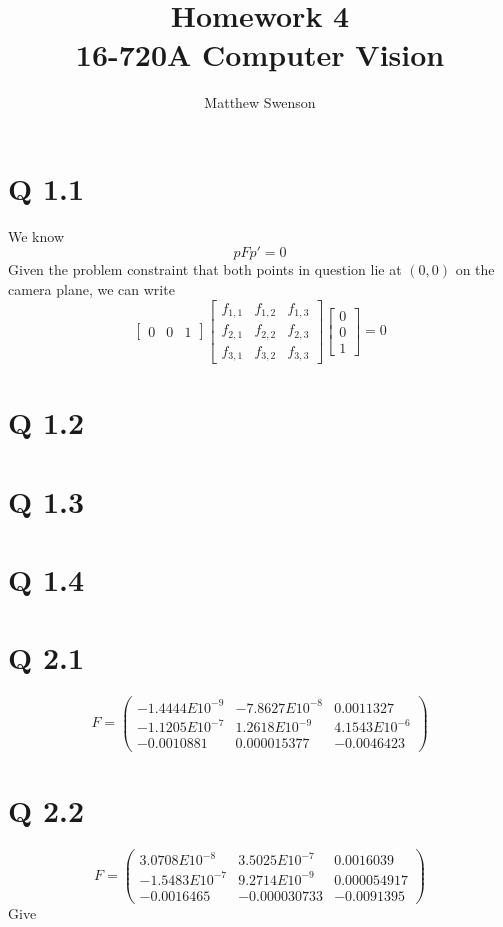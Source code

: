 \documentclass[11pt]{article}
\title{Homework 4\\ \vspace{2mm}\Large{16-720A Computer Vision }}
\author{Matthew Swenson}
\begin{document}
	\maketitle
	
\section*{Q 1.1}
We know 
$$pFp'=0$$
Given the problem constraint that both points in question lie at $(0,0)$ on the camera plane, we can write
$$
\begin{bmatrix}0 &0& 1\end{bmatrix}
\left[\begin{array}{ccc} f_{1,1} & f_{1,2} & f_{1,3}\\ f_{2,1} & f_{2,2} & f_{2,3}\\ f_{3,1} & f_{3,
2} & f_{3,3} \end{array}\right]
\begin{bmatrix}0\\ 0\\ 1\end{bmatrix}
    =
    0
$$

\section*{Q 1.2}
\section*{Q 1.3}
\section*{Q 1.4}
\section*{Q 2.1}
    $$F=\left(\begin{array}{ccc} -1.4444E{10}^{-9} & -7.8627E{10}^{-8} & 0.0011327\\ -1.1205E{10}^{-7} &
1.2618E{10}^{-9} & 4.1543E{10}^{-6}\\ -0.0010881 & 0.000015377 & -0.0046423 \end{array}\right)$$
\section*{Q 2.2}
    $$F=\left(\begin{array}{ccc} 3.0708E{10}^{-8} & 3.5025E{10}^{-7} & 0.0016039\\ -1.5483E{10}^{-7} & 9.
2714E{10}^{-9} & 0.000054917\\ -0.0016465 & -0.000030733 & -0.0091395 \end{array}\right)$$
Give
\end{document}

